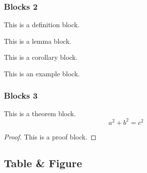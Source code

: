 \documentclass[compress,aspectratio=43]{beamer}
\begin{document}
\begin{frame}
    \frametitle{Blocks 2}
    \begin{definition}[XXX]
        This is a definition block.
    \end{definition}

    \begin{lemma}[XXX]
        This is a lemma block.
    \end{lemma}

    \begin{corollary}[XXX]
        This is a corollary block.
    \end{corollary}

    \begin{example}[XXX]
        This is an example block.
    \end{example}

\end{frame}

\begin{frame}
    \frametitle{Blocks 3}
    \begin{theorem}[XXX]
        This is a theorem block.
        \[
            a^2 + b^2 = c^2
        \]
    \end{theorem}

    \begin{proof}
        This is a proof block.
    \end{proof}

\end{frame}

\subsection{Table \& Figure}
\end{document}
